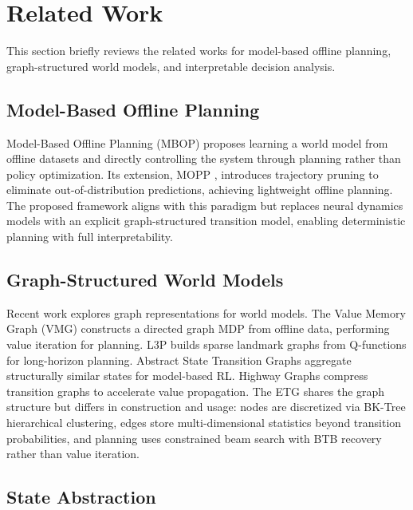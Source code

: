 \documentclass[letterpaper]{article}
\begin{document}
\section{Related Work}
\label{sec:related}

This section briefly reviews the related works for model-based offline planning, graph-structured world models, and interpretable decision analysis.

\subsection{Model-Based Offline Planning}

Model-Based Offline Planning (MBOP) \citep{argenson2021mbop} proposes learning a world model from offline datasets and directly controlling the system through planning rather than policy optimization. Its extension, MOPP \citep{zhan2022mopp}, introduces trajectory pruning to eliminate out-of-distribution predictions, achieving lightweight offline planning. The proposed framework aligns with this paradigm but replaces neural dynamics models with an explicit graph-structured transition model, enabling deterministic planning with full interpretability.

\subsection{Graph-Structured World Models}

Recent work explores graph representations for world models. The Value Memory Graph (VMG) \citep{zhu2023vmg} constructs a directed graph MDP from offline data, performing value iteration for planning. L3P \citep{zhang2021l3p} builds sparse landmark graphs from Q-functions for long-horizon planning. Abstract State Transition Graphs \citep{demendonca2018astg} aggregate structurally similar states for model-based RL. Highway Graphs \citep{yin2024highway} compress transition graphs to accelerate value propagation. The ETG shares the graph structure but differs in construction and usage: nodes are discretized via BK-Tree hierarchical clustering, edges store multi-dimensional statistics beyond transition probabilities, and planning uses constrained beam search with BTB recovery rather than value iteration.

\subsection{State Abstraction}
\end{document}
